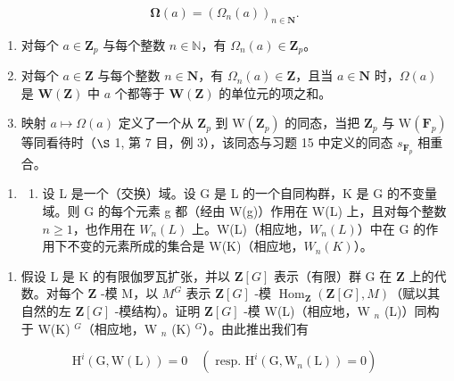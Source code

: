 \[
\boldsymbol {\Omega} (a) = \left(\Omega_ {n} (a)\right) _ {n \in \mathbf {N}}.
\]

\begin{enumerate}
\def\labelenumi{\alph{enumi})}
\item
  对每个 \(a \in \mathbf{Z}_p\) 与每个整数 \(n \in \mathbb{N}\)，有 \(\Omega_n(a) \in \mathbf{Z}_p\)。
\item
  对每个 \(a \in \mathbf{Z}\) 与每个整数 \(n \in \mathbf{N}\)，有 \(\Omega_n(a) \in \mathbf{Z}\)，且当 \(a \in \mathbf{N}\) 时，\(\Omega(a)\) 是 \(\mathbf{W}(\mathbf{Z})\) 中 \(a\) 个都等于 \(\mathbf{W}(\mathbf{Z})\) 的单位元的项之和。
\item
  映射 \(a \mapsto \Omega(a)\) 定义了一个从 \(\mathbf{Z}_{p}\) 到 \(\mathrm{W}(\mathbf{Z}_{p})\) 的同态，当把 \(\mathbf{Z}_{p}\) 与 \(\mathrm{W}(\mathbf{F}_{p})\) 等同看待时（\(\S\) 1, 第 7 目，例 3），该同态与习题 15 中定义的同态 \(s_{\mathbf{F}_{p}}\) 相重合。
\end{enumerate}

\begin{enumerate}
\def\labelenumi{\arabic{enumi})}
\setcounter{enumi}{17}
\tightlist
\item
  \begin{enumerate}
  \def\labelenumii{\alph{enumii})}
  \tightlist
  \item
    设 L 是一个（交换）域。设 G 是 L 的一个自同构群，K 是 G 的不变量域。则 G 的每个元素 g 都（经由 W(g)）作用在 W(L) 上，且对每个整数 \(n \geqslant 1\)，也作用在 \(W_{n}(L)\) 上。W(L)（相应地，\(W_{n}(L)\)）中在 G 的作用下不变的元素所成的集合是 W(K)（相应地，\(W_{n}(K)\)）。
  \end{enumerate}
\end{enumerate}

\begin{enumerate}
\def\labelenumi{\alph{enumi})}
\setcounter{enumi}{1}
\tightlist
\item
  假设 L 是 K 的有限伽罗瓦扩张，并以 \(\mathbf{Z}[G]\) 表示（有限）群 G 在 \(\mathbf{Z}\) 上的代数。对每个 \(\mathbf{Z}\) -模 M，以 \(M^{G}\) 表示 \(\mathbf{Z}[G]\) -模 \(\operatorname{Hom}_{\mathbf{Z}}(\mathbf{Z}[G], M)\)（赋以其自然的左 \(\mathbf{Z}[G]\) -模结构）。证明 \(\mathbf{Z}[G]\) -模 W(L)（相应地，W \(_{n}\) (L)）同构于 W(K) \(^{G}\)（相应地，W \(_{n}\) (K) \(^{G}\)）。由此推出我们有
\end{enumerate}

\[
\mathrm{H} ^ {i} (\mathrm{G}, \mathrm{W} (\mathrm{L})) = 0 \quad (\text { resp. } \mathrm{H} ^ {i} (\mathrm{G}, \mathrm{W} _ {n} (\mathrm{L})) = 0)
\]


